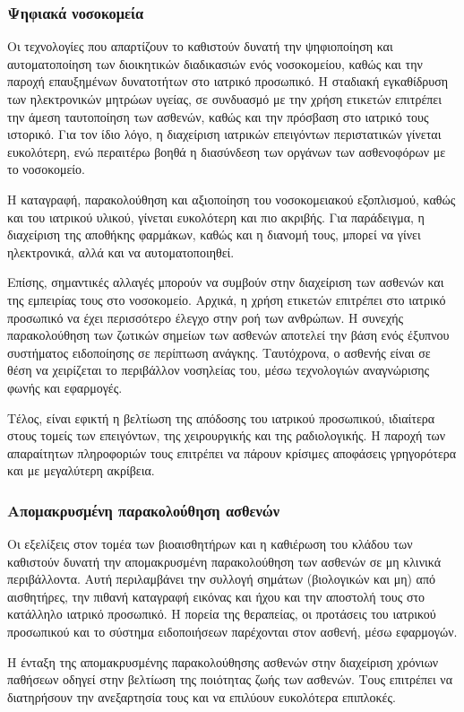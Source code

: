 \subsubsection{Ψηφιακά νοσοκομεία}
Οι τεχνολογίες που απαρτίζουν το  καθιστούν δυνατή την ψηφιοποίηση και αυτοματοποίηση των διοικητικών διαδικασιών ενός νοσοκομείου, καθώς και την παροχή επαυξημένων δυνατοτήτων στο ιατρικό προσωπικό.
Η σταδιακή εγκαθίδρυση των ηλεκτρονικών μητρώων υγείας, σε συνδυασμό με την χρήση ετικετών  επιτρέπει την άμεση ταυτοποίηση των ασθενών, καθώς και την πρόσβαση στο ιατρικό τους ιστορικό.
Για τον ίδιο λόγο, η διαχείριση ιατρικών επειγόντων περιστατικών γίνεται ευκολότερη, ενώ περαιτέρω βοηθά η διασύνδεση των οργάνων των ασθενοφόρων με το νοσοκομείο.
\par
Η καταγραφή, παρακολούθηση και αξιοποίηση του νοσοκομειακού εξοπλισμού, καθώς και του ιατρικού υλικού, γίνεται ευκολότερη και πιο ακριβής.
Για παράδειγμα, η διαχείριση της αποθήκης φαρμάκων, καθώς και η διανομή τους, μπορεί να γίνει ηλεκτρονικά, αλλά και να αυτοματοποιηθεί.
\par
Επίσης, σημαντικές αλλαγές μπορούν να συμβούν στην διαχείριση των ασθενών και της εμπειρίας τους στο νοσοκομείο.
Αρχικά, η χρήση ετικετών  επιτρέπει στο ιατρικό προσωπικό να έχει περισσότερο έλεγχο στην ροή των ανθρώπων.
Η συνεχής παρακολούθηση των ζωτικών σημείων των ασθενών αποτελεί την βάση ενός έξυπνου συστήματος ειδοποίησης σε περίπτωση ανάγκης.
Ταυτόχρονα, ο ασθενής είναι σε θέση να χειρίζεται το περιβάλλον νοσηλείας του, μέσω τεχνολογιών αναγνώρισης φωνής και  εφαρμογές.
\par
Τέλος, είναι εφικτή η βελτίωση της απόδοσης του ιατρικού προσωπικού, ιδιαίτερα στους τομείς των επειγόντων, της χειρουργικής και της ραδιολογικής.
Η παροχή των απαραίτητων πληροφοριών τους επιτρέπει να πάρουν κρίσιμες αποφάσεις γρηγορότερα και με μεγαλύτερη ακρίβεια.
\subsubsection{Απομακρυσμένη παρακολούθηση ασθενών}
Οι εξελίξεις στον τομέα των βιοαισθητήρων και η καθιέρωση του κλάδου των  καθιστούν δυνατή την απομακρυσμένη παρακολούθηση των ασθενών σε μη κλινικά περιβάλλοντα.
Αυτή περιλαμβάνει την συλλογή σημάτων (βιολογικών και μη) από αισθητήρες, την πιθανή καταγραφή εικόνας και ήχου και την αποστολή τους στο κατάλληλο ιατρικό προσωπικό.
Η πορεία της θεραπείας, οι προτάσεις του ιατρικού προσωπικού και το σύστημα ειδοποιήσεων παρέχονται στον ασθενή, μέσω  εφαρμογών.
\par
Η ένταξη της απομακρυσμένης παρακολούθησης ασθενών στην διαχείριση χρόνιων παθήσεων οδηγεί στην βελτίωση της ποιότητας ζωής των ασθενών.
Τους επιτρέπει να διατηρήσουν την ανεξαρτησία τους και να επιλύουν ευκολότερα επιπλοκές.
